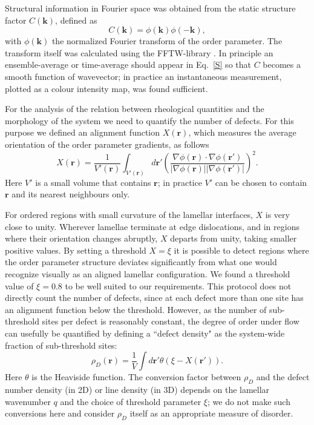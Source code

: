 \documentclass[8.5pt,twoside,twocolumn]{article}
\begin{document}
Structural information in Fourier space was obtained from the static structure factor $C({\mathbf k})$, defined as
%
\begin{equation}
C({\mathbf k})=\phi({\mathbf k})\phi(-{\mathbf k}),
\label{S}\end{equation}
%
with $\phi({\mathbf k})$ the normalized Fourier transform of the order parameter.
The transform itself was calculated using the FFTW-library \cite{FFTW}.
In principle an ensemble-average or time-average should appear in Eq.~\ref{S} so that $C$ becomes a smooth function of wavevector; in practice an instantaneous measurement, plotted as a colour intensity map, was found sufficient.

For the analysis of the relation between rheological quantities and the morphology of the system we need to quantify the number of defects.
For this purpose we defined an alignment function $X({\mathbf r})$, which measures the average orientation of the order parameter gradients, as follows
%
\begin{equation}\label{alignment}
X({\mathbf r})=\frac{1}{V'({\mathbf r})} \int_{V'({\mathbf r})} d{\mathbf r'} \left(\frac{\nabla \phi ({\mathbf r}) \cdot \nabla \phi ({\mathbf r'})}{|\nabla\phi ({\mathbf r}) ||\nabla\phi ({\mathbf r'}) |}\right)^2. 
\end{equation}
%
Here $V'$ is a small volume that contains $\mathbf r$; in practice $V'$ can be chosen to contain $\mathbf r$ and its nearest neighbours only.

For ordered regions with small curvature of the lamellar interfaces, $X$ is very close to unity. Wherever lamellae terminate at edge dislocations, and in regions where their orientation changes abruptly, $X$ departs from unity, taking smaller positive values.
By setting a threshold $X=\xi$ it is possible to detect regions where the order parameter structure deviates significantly from what one would recognize visually as an aligned lamellar configuration.
We found a threshold value of $\xi=0.8$ to be well suited to our requirements. This protocol does not directly count the number of defects, since at each defect more than one site has an alignment function below the threshold.
However, as the number of sub-threshold sites per defect is reasonably constant, the degree of order under flow can usefully be quantified by defining a ``defect density" as the system-wide fraction of sub-threshold sites:
%
\begin{equation}\label{defect density}
\rho_D({\mathbf r})=\frac{1}{V} \int d{\mathbf r'} \theta(\xi-X(\mathbf r')).  
\end{equation}
%
Here $\theta$ is the Heaviside function. The conversion factor between $\rho_D$ and the defect number density (in 2D) or line density (in 3D) depends on the lamellar wavenumber $q$ and the choice of threshold parameter $\xi$; we do not make such conversions here and consider $\rho_D$ itself as an appropriate measure of disorder.
\end{document}
